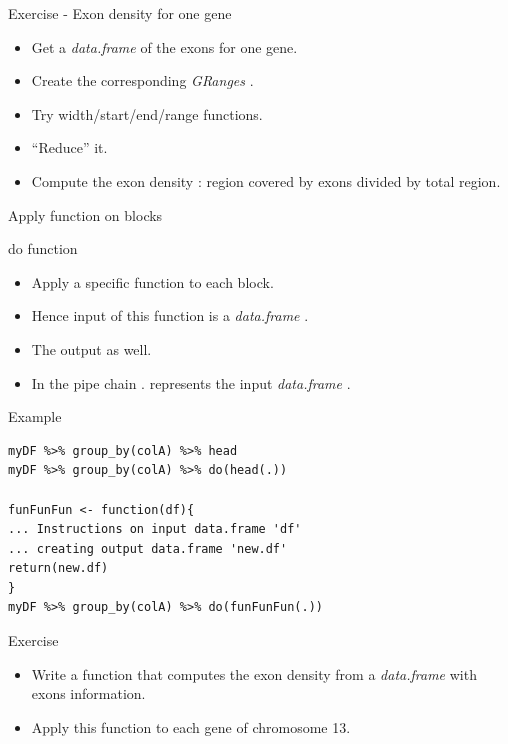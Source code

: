 \documentclass[10pt]{beamer}
\newcommand{\df}{{\it data.frame} }
\newcommand{\gr}{{\it GRanges} }
\begin{document}
\begin{frame}{Exercise - Exon density for one gene}
  \begin{itemize}
  \item Get a \df of the exons for one gene.
  \item Create the corresponding \gr.
  \item Try {\sf width/start/end/range} functions.
  \item ``Reduce'' it.
    \bigskip
  \item Compute the exon density : region covered by exons divided by total region.
  \end{itemize}
\end{frame}

\begin{frame}[fragile, shrink=20]{Apply function on blocks}
  \begin{block}{{\sf do} function}
    \begin{itemize}
    \item Apply a specific function to each block.
    \item Hence input of this function is a \df.
    \item The output as well.
      \bigskip
    \item In the pipe chain {\sf .} represents the input \df.
    \end{itemize}
  \end{block}
  \begin{exampleblock}{Example}
\begin{verbatim}
myDF %>% group_by(colA) %>% head
myDF %>% group_by(colA) %>% do(head(.))

funFunFun <- function(df){
... Instructions on input data.frame 'df'
... creating output data.frame 'new.df'
return(new.df)
}
myDF %>% group_by(colA) %>% do(funFunFun(.))
\end{verbatim}
  \end{exampleblock}
  \begin{alertblock}{Exercise}
    \begin{itemize}
    \item Write a function that computes the exon density from a \df with exons information.
    \item Apply this function to each gene of chromosome 13. 
    \end{itemize}
  \end{alertblock}
\end{frame}
\end{document}
